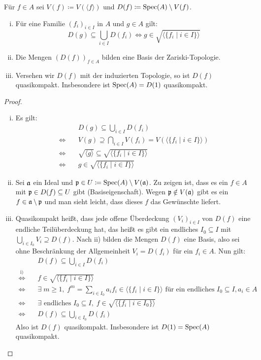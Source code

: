 \begin{prop}
\label{prop:4.8}
	Für $f \in A$ sei $V(f) \coloneqq V(\langle f \rangle)$ und $D(f)\coloneqq \operatorname{Spec}(A) \setminus V(f)$.
	\begin{enumerate}[i)]
		\item Für eine Familie $(f_i)_{i\in I}$ in $A$ und $g \in A$ gilt:
		\[
			D(g) \subseteq \bigcup_{i\in I}D(f_i) \Leftrightarrow g \in \sqrt{\langle \{f_i \mid i \in I\}\rangle}
		\]
		\item Die Mengen $(D(f))_{f\in A}$ bilden eine Basis der Zariski-Topologie.
		\item Versehen wir $D(f)$ mit der induzierten Topologie, so ist $D(f)$ quasikompakt. Insbesondere ist $\operatorname{Spec}(A)=D(1)$ quasikompakt.
	\end{enumerate}
	\begin{proof}
		\begin{enumerate}[i)]
			\item Es gilt:
			\begin{align*}
				&D(g) \subseteq \bigcup_{i\in I} D(f_i)\\
				\Longleftrightarrow \quad & V(g) \supseteq \bigcap_{i \in I} V(f_i) = V(\langle\{f_i\mid i \in I\}\rangle)\\
				\Longleftrightarrow \quad & \sqrt{\langle g \rangle} \subseteq \sqrt{\langle\{f_i\mid i \in I\}\rangle}\\
				\Longleftrightarrow \quad & g \in \sqrt{\langle\{f_i\mid i \in I\}\rangle}
			\end{align*}
			\item Sei $\mathfrak{a}$ ein Ideal und $\mathfrak{p} \in U \coloneqq \operatorname{Spec}(A) \setminus V(\mathfrak{a})$. Zu zeigen ist, dass es ein $f \in A$ mit $\mathfrak{p} \in D(f) \subseteq U$ gibt (Basiseigenschaft). Wegen $\mathfrak{p} \notin V(\mathfrak{a})$ gibt es ein $f \in \mathfrak{a} \setminus \mathfrak{p}$ und man sieht leicht, dass dieses $f$ das Gewünschte liefert.
			\item Quasikompakt heißt, dass jede offene Überdeckung $(V_i)_{i\in I}$ von $D(f)$ eine endliche Teilüberdeckung hat, das heißt es gibt ein endliches $I_0 \subseteq I$ mit $\bigcup_{i\in I_0} V_i \supseteq D(f)$. Nach ii) bilden die Mengen $D(f)$ eine Basis, also sei ohne Beschränkung der Allgemeinheit $V_i = D(f_i)$ für ein $f_i \in A$. Nun gilt:
			\begin{align*}
				&D(f) \subseteq \bigcup_{i \in I} D(f_i)\\
				\overset{\text{i)}}{\Longleftrightarrow} \quad & f \in \sqrt{\langle \{f_i \mid i \in I\}\rangle}\\
				\Longleftrightarrow \quad & \exists\; m \ge 1,\; f^m = \sum_{i\in I_0} a_i f_i \in \langle \{f_i \mid i \in I\}\rangle \text{ für ein endliches }I_0 \subseteq I, a_i \in A\\
				\Longleftrightarrow \quad & \exists \text{ endliches } I_0 \subseteq I,\; f \in \sqrt{\langle\{f_i\mid i \in I_0\}\rangle}\\
				\Longleftrightarrow \quad & D(f) \subseteq \bigcup_{i \in I_0} D(f_i)
			\end{align*}
			Also ist $D(f)$ quasikompakt. Insbesondere ist $D(1) = \operatorname{Spec}(A)$ quasikompakt.
		\end{enumerate}
	\end{proof}
\end{prop}
